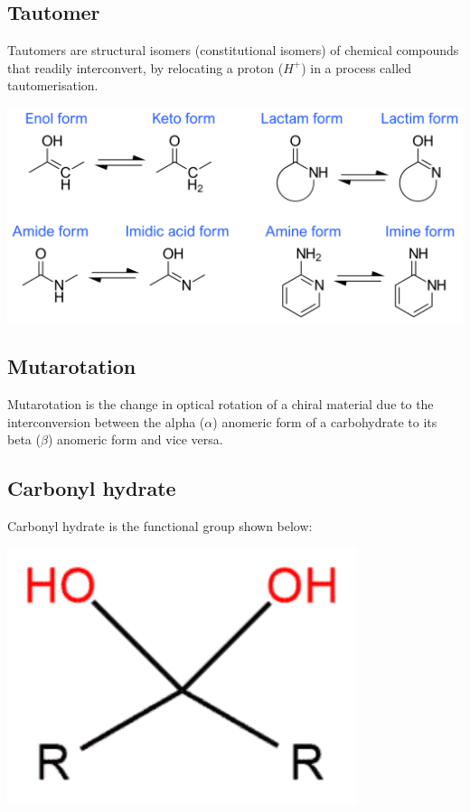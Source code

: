 \documentclass[11pt]{article}
\begin{document}
\subsection{Tautomer}
\label{sec:org2f46d77}
Tautomers are structural isomers (constitutional isomers) of chemical compounds that readily interconvert, by relocating a proton (\(H^+\)) in a process called tautomerisation.
\begin{center}
\includegraphics[width=.9\linewidth]{./images/tautomers.png}
\end{center}

\subsection{Mutarotation}
\label{sec:org03dfa30}
Mutarotation is the change in optical rotation of a chiral material due to the interconversion between the alpha (\(\alpha\)) anomeric form of a carbohydrate to its beta (\(\beta\)) anomeric form and vice versa.

\subsection{Carbonyl hydrate}
\label{sec:org3b9268a}
Carbonyl hydrate is the functional group shown below:

\begin{center}
\includegraphics[scale=1.0]{./images/carbonyl-hydrate.png}
\end{center}
\end{document}
